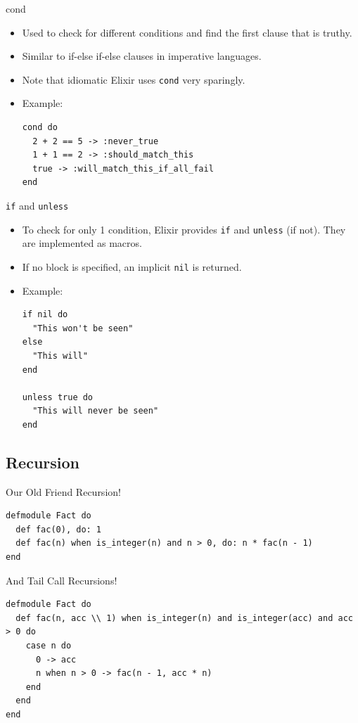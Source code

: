 \documentclass[12pt]{beamer}
\begin{document}
\begin{frame}[fragile]{cond}
  \begin{itemize}
    \item Used to check for different conditions and find the first clause that is truthy.
    \item Similar to if-else if-else clauses in imperative languages.
    \item Note that idiomatic Elixir uses \texttt{cond} very sparingly.
    \item Example:
          \begin{verbatim}
cond do
  2 + 2 == 5 -> :never_true
  1 + 1 == 2 -> :should_match_this
  true -> :will_match_this_if_all_fail
end
  \end{verbatim}
  \end{itemize}
\end{frame}

\begin{frame}[fragile]{\texttt{if} and \texttt{unless}}
  \begin{itemize}
    \item To check for only 1 condition, Elixir provides \texttt{if} and \texttt{unless} (if not). They are implemented as macros.
    \item If no block is specified, an implicit \texttt{nil} is returned.
    \item Example:
          \begin{verbatim}
if nil do
  "This won't be seen"
else
  "This will"
end

unless true do
  "This will never be seen"
end
  \end{verbatim}
  \end{itemize}
\end{frame}

\subsection{Recursion}
\begin{frame}[fragile]{Our Old Friend Recursion!}
  \begin{verbatim}
defmodule Fact do
  def fac(0), do: 1
  def fac(n) when is_integer(n) and n > 0, do: n * fac(n - 1)
end
  \end{verbatim}
\end{frame}

\begin{frame}[fragile]{And Tail Call Recursions!}
  \begin{verbatim}
defmodule Fact do
  def fac(n, acc \\ 1) when is_integer(n) and is_integer(acc) and acc > 0 do
    case n do
      0 -> acc
      n when n > 0 -> fac(n - 1, acc * n)
    end
  end
end
  \end{verbatim}
\end{frame}
\end{document}
